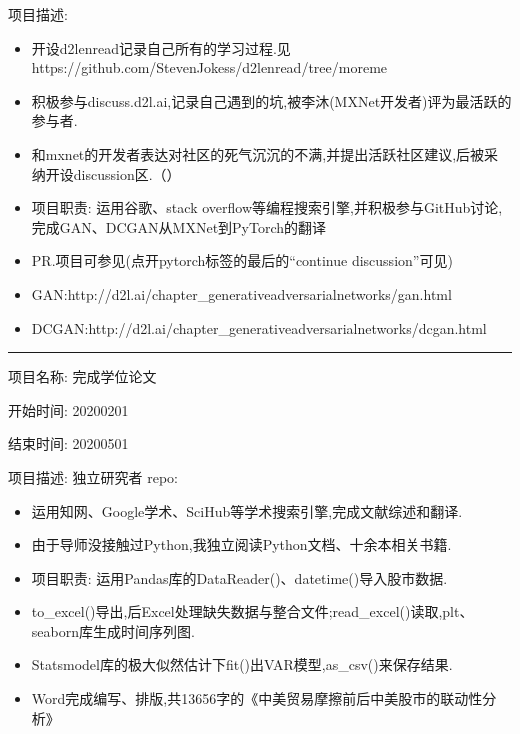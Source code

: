 \documentclass[letterpaper,11pt,english]{sphinxmanual}
\begin{document}
项目描述:
\begin{itemize}
\item {} 
开设d2l\sphinxhyphen{}en\sphinxhyphen{}read记录自己所有的学习过程.见https://github.com/StevenJokess/d2l\sphinxhyphen{}en\sphinxhyphen{}read/tree/moreme

\item {} 
积极参与discuss.d2l.ai,记录自己遇到的坑,被李沐(MXNet开发者)评为最活跃的参与者.

\item {} 
和mxnet的开发者表达对社区的死气沉沉的不满,并提出活跃社区建议,后被采纳开设discussion区.（）

\item {} 
项目职责: 运用谷歌、stack
overflow等编程搜索引擎,并积极参与GitHub讨论,完成GAN、DCGAN从MXNet到PyTorch的翻译

\item {} 
PR.项目可参见(点开pytorch标签的最后的“continue discussion”可见)

\item {} 
GAN:http://d2l.ai/chapter\_generative\sphinxhyphen{}adversarial\sphinxhyphen{}networks/gan.html

\item {} 
DCGAN:http://d2l.ai/chapter\_generative\sphinxhyphen{}adversarial\sphinxhyphen{}networks/dcgan.html

\end{itemize}


\bigskip\hrule\bigskip


项目名称: 完成学位论文

开始时间: 2020\sphinxhyphen{}02\sphinxhyphen{}01

结束时间: 2020\sphinxhyphen{}05\sphinxhyphen{}01

项目描述: 独立研究者 repo: 
\begin{itemize}
\item {} 
运用知网、Google学术、SciHub等学术搜索引擎,完成文献综述和翻译.

\item {} 
由于导师没接触过Python,我独立阅读Python文档、十余本相关书籍.

\item {} 
项目职责: 运用Pandas库的DataReader()、datetime()导入股市数据.

\item {} 
to\_excel()导出,后Excel处理缺失数据与整合文件;read\_excel()读取,plt、seaborn库生成时间序列图.

\item {} 
Statsmodel库的极大似然估计下fit()出VAR模型,as\_csv()来保存结果.

\item {} 
Word完成编写、排版,共13656字的《中美贸易摩擦前后中美股市的联动性分析》

\end{itemize}
\end{document}
